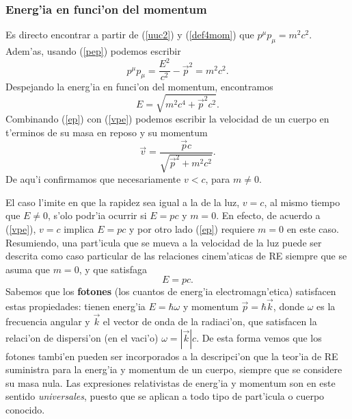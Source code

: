 \subsubsection{Energ'ia en funci'on del momentum}

Es directo encontrar a partir de (\ref{uuc2}) y (\ref{def4mom}) que $p^\mu
p_\mu=m^2c^2$. Adem'as, usando (\ref{pep}) podemos escribir
\begin{equation}
p^\mu p_\mu =\frac{E^2}{c^2}-\vec{p}^2=m^2c^2.
\end{equation}
Despejando la energ'ia en funci'on del momentum, encontramos
\begin{equation}
\boxed{E=\sqrt{m^2c^4+\vec{p}^2c^2}.} \label{ep}
\end{equation}
Combinando (\ref{ep}) con (\ref{vpe}) podemos escribir la velocidad de un cuerpo en t'erminos de su masa en reposo y su momentum
\begin{equation}
\vec{v}=\frac{\vec{p}c}{\sqrt{\vec{p}^2+m^2c^2}}. \label{vpp}
\end{equation}
De aqu'i confirmamos que necesariamente $v<c$, para $m\neq 0$.

El caso l'imite en que la rapidez sea igual a la de la luz, $v=c$, al mismo tiempo que $E\neq 0$, s'olo podr'ia ocurrir si $E=pc$ y $m=0$. En efecto, de acuerdo a (\ref{vpe}), $v=c$ implica $E=pc$ y por otro lado (\ref{ep}) requiere $m=0$ en este caso. Resumiendo, una part'icula que se mueva a la velocidad de la luz puede ser descrita como caso particular de las relaciones cinem'aticas de RE siempre que se asuma que $m=0$, y que satisfaga
\begin{equation}
E=pc.
\end{equation}
Sabemos que los \textbf{fotones} (los cuantos de energ'ia electromagn'etica) satisfacen estas propiedades: tienen energ'ia $E=\hbar\omega$ y momentum $\vec{p}=\hbar\vec{k}$, donde $\omega$ es la frecuencia angular y $\vec{k}$ el vector de onda de la radiaci'on, que satisfacen la relaci'on de dispersi'on (en el vaci'o) $\omega=|\vec{k}|c$. De esta forma vemos que los fotones tambi'en pueden ser incorporados a la descripci'on que la teor'ia de RE suministra para la energ'ia y momentum de un cuerpo, siempre que se considere su masa nula. Las expresiones relativistas de energ'ia y momentum son en este sentido \textit{universales}, puesto que se aplican a todo tipo de part'icula o cuerpo conocido.



